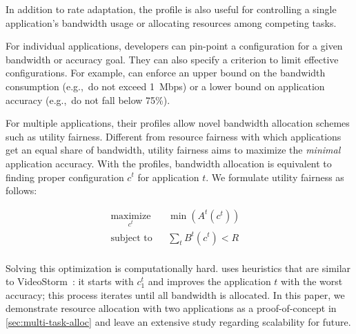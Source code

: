 In addition to rate adaptation, the profile is also useful for controlling a
single application's bandwidth usage or allocating resources among competing
tasks.

For individual applications, developers can pin-point a configuration for a
given bandwidth or accuracy goal. They can also specify a criterion to limit
effective configurations. For example, \sysname{} can enforce an upper bound on
the bandwidth consumption (e.g.,~do not exceed \SI{1}{Mbps}) or a lower bound on
application accuracy (e.g.,~do not fall below 75\%).

For multiple applications, their profiles allow novel bandwidth allocation
schemes such as utility fairness. Different from resource fairness with which
applications get an equal share of bandwidth, utility fairness aims to maximize
the \textit{minimal} application accuracy. With the profiles, bandwidth
allocation is equivalent to finding proper configuration $c^t$ for application
$t$. We formulate utility fairness as follows:



\begin{equation}
 \label{eq:multitask}
 \begin{aligned}
    & \underset{c^t}{\text{maximize}} & & \min({A^t(c^t)}) & & \\
    & \text{subject to} & & \sum_t{B^t(c^t)} < R & & \\
 \end{aligned}
\end{equation}

Solving this optimization is computationally hard. \sysname{} uses heuristics
that are similar to VideoStorm~\cite{zhang2017live}: it starts with $c^t_1$ and
improves the application $t$ with the worst accuracy; this process iterates
until all bandwidth is allocated. In this paper, we demonstrate resource
allocation with two applications as a proof-of-concept in
\autoref{sec:multi-task-alloc} and leave an extensive study regarding
scalability for future.



